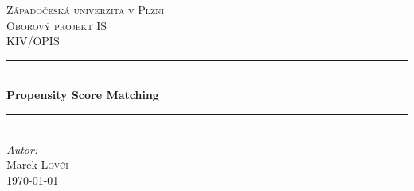 	
\linespread{1}

\begin{titlepage}
	
	\newcommand{\HRule}{\rule{\linewidth}{0.5mm}} %
	
	\center{} %
	 
	
	\textsc{\LARGE Západočeská univerzita v Plzni}\\[1.5cm] %
	\textsc{\Large Oborový projekt IS}\\[0.5cm] %
	\textsc{\large KIV/OPIS}\\[0.5cm] %
	
	
	\HRule{} \\[0.4cm]
	{\huge \bfseries Propensity Score Matching}\\ %
	\HRule{} \\[1.5cm]
	 
	
	\Large \emph{Autor:}\\
	Marek \textsc{Lovčí}\\[3.3cm]
	
	
	{\large \today}\\[2cm] %
	
	

\end{titlepage}
